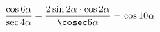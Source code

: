 \begin{ex}[type=prove_identity]
	\begin{condition}
		\( \dfrac{\cos6\alpha}{\sec4\alpha}-\dfrac{2\sin2\alpha\cdot\cos2\alpha}{\cosec6\alpha}=\cos10\alpha \)
	\end{condition}
\end{ex}